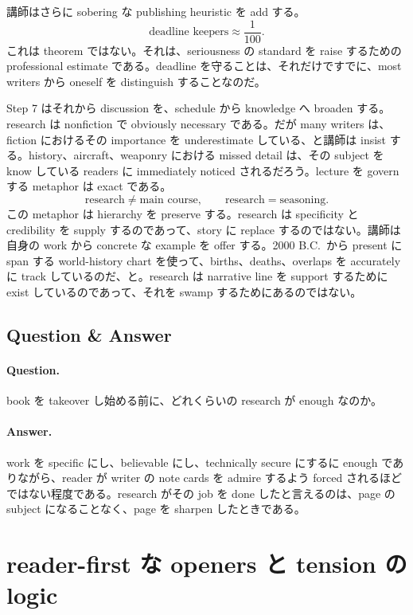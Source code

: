 講師はさらに sobering な publishing heuristic を add する。
\begin{equation}
\text{deadline keepers} \approx \frac{1}{100}.
\end{equation}
これは theorem ではない。それは、seriousness の standard を raise するための professional estimate である。deadline を守ることは、それだけですでに、most writers から oneself を distinguish することなのだ。

Step 7 はそれから discussion を、schedule から knowledge へ broaden する。research は nonfiction で obviously necessary である。だが many writers は、fiction におけるその importance を underestimate している、と講師は insist する。history、aircraft、weaponry における missed detail は、その subject を know している readers に immediately noticed されるだろう。lecture を govern する metaphor は exact である。
\begin{equation}
\text{research} \neq \text{main course}, \qquad
\text{research} = \text{seasoning}.
\end{equation}
この metaphor は hierarchy を preserve する。research は specificity と credibility を supply するのであって、story に replace するのではない。講師は自身の work から concrete な example を offer する。2000 B.C.\ から present に span する world-history chart を使って、births、deaths、overlaps を accurately に track しているのだ、と。research は narrative line を support するために exist しているのであって、それを swamp するためにあるのではない。

\subsection{Question \& Answer}

\paragraph{Question.} book を takeover し始める前に、どれくらいの research が enough なのか。

\paragraph{Answer.} work を specific にし、believable にし、technically secure にするに enough でありながら、reader が writer の note cards を admire するよう forced されるほどではない程度である。research がその job を done したと言えるのは、page の subject になることなく、page を sharpen したときである。

\section{reader-first な openers と tension の logic}

